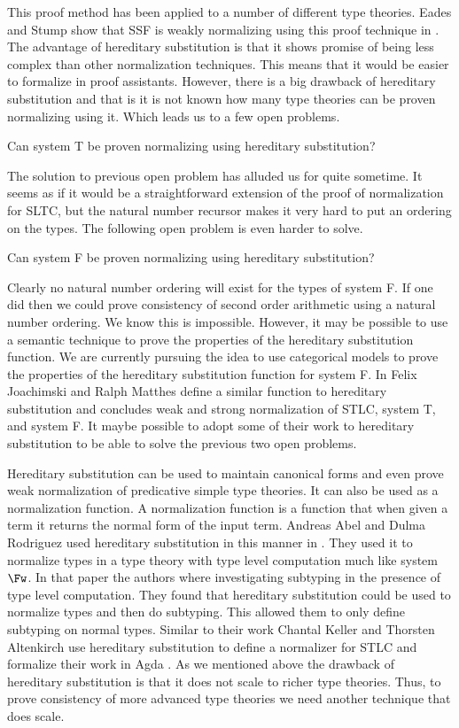 \documentclass{article}
\begin{document}
This proof method has been applied to a number of different type
theories.  Eades and Stump show that SSF is weakly normalizing using
this proof technique in \cite{Eades:2010}.  The advantage of
hereditary substitution is that it shows promise of being less complex
than other normalization techniques.  This means that it would be
easier to formalize in proof assistants.  However, there is a big
drawback of hereditary substitution and that is it is not known how
many type theories can be proven normalizing using it.  Which leads us
to a few open problems.
\begin{openproblem}
  Can system T be proven normalizing using hereditary substitution?
\end{openproblem}
\noindent
The solution to previous open problem has alluded us for quite
sometime.  It seems as if it would be a straightforward extension of
the proof of normalization for SLTC, but the natural number recursor
makes it very hard to put an ordering on the types.  The following
open problem is even harder to solve.
\begin{openproblem}
  Can system F be proven normalizing using hereditary substitution?
\end{openproblem}
\noindent
Clearly no natural number ordering will exist for the types of system
F.  If one did then we could prove consistency of second order
arithmetic using a natural number ordering.  We know this is
impossible.  However, it may be possible to use a semantic technique
to prove the properties of the hereditary substitution function.  We
are currently pursuing the idea to use categorical models to prove the
properties of the hereditary substitution function for system F.  In
\cite{Joachimski:1999} Felix Joachimski and Ralph Matthes define a
similar function to hereditary substitution and concludes weak and
strong normalization of STLC, system T, and system F.  It maybe
possible to adopt some of their work to hereditary substitution to be
able to solve the previous two open problems.

Hereditary substitution can be used to maintain canonical forms and
even prove weak normalization of predicative simple type theories.  It
can also be used as a normalization function.  A normalization
function is a function that when given a term it returns the normal
form of the input term.  Andreas Abel and Dulma Rodriguez used
hereditary substitution in this manner in \cite{Abel:2008}.  They used
it to normalize types in a type theory with type level computation
much like system $\Fw$.  In that paper the authors where investigating
subtyping in the presence of type level computation.  They found that
hereditary substitution could be used to normalize types and then do
subtyping.  This allowed them to only define subtyping on normal
types.  Similar to their work Chantal Keller and Thorsten Altenkirch
use hereditary substitution to define a normalizer for STLC and
formalize their work in Agda \cite{Keller:2010}.
As we mentioned above the drawback of hereditary substitution is that
it does not scale to richer type theories.  Thus, to prove consistency
of more advanced type theories we need another technique that does
scale.
\end{document}
